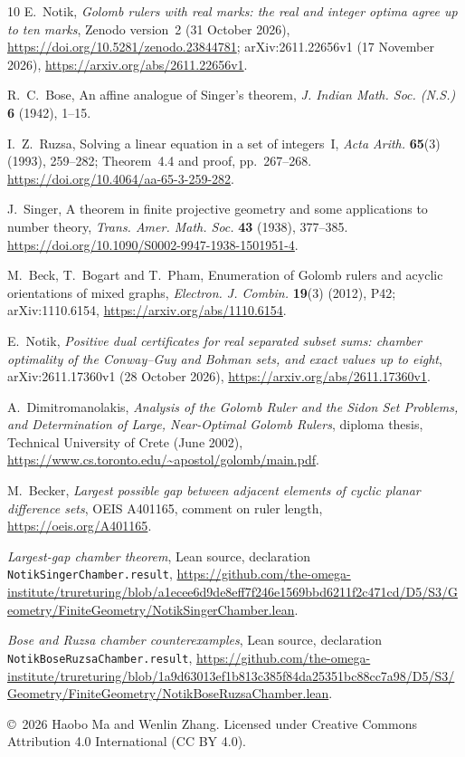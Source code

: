 \documentclass[11pt,a4paper]{article}
\begin{document}
\begin{thebibliography}{10}
E.~Notik, \emph{Golomb rulers with real marks: the real and integer optima
agree up to ten marks}, Zenodo version~2 (31 October 2026),
\url{https://doi.org/10.5281/zenodo.23844781};
arXiv:2611.22656v1 (17 November 2026),
\url{https://arxiv.org/abs/2611.22656v1}.

R.~C.~Bose, An affine analogue of Singer's theorem,
\emph{J. Indian Math. Soc. (N.S.)} \textbf{6} (1942), 1--15.

I.~Z.~Ruzsa, Solving a linear equation in a set of integers~I,
\emph{Acta Arith.} \textbf{65}(3) (1993), 259--282;
Theorem~4.4 and proof, pp.~267--268.
\url{https://doi.org/10.4064/aa-65-3-259-282}.

J.~Singer, A theorem in finite projective geometry and some applications
to number theory, \emph{Trans. Amer. Math. Soc.} \textbf{43} (1938),
377--385. \url{https://doi.org/10.1090/S0002-9947-1938-1501951-4}.

M.~Beck, T.~Bogart and T.~Pham, Enumeration of Golomb rulers and acyclic
orientations of mixed graphs, \emph{Electron. J. Combin.}
\textbf{19}(3) (2012), P42; arXiv:1110.6154,
\url{https://arxiv.org/abs/1110.6154}.

E.~Notik, \emph{Positive dual certificates for real separated subset sums:
chamber optimality of the Conway--Guy and Bohman sets, and exact values
up to eight}, arXiv:2611.17360v1 (28 October 2026),
\url{https://arxiv.org/abs/2611.17360v1}.

A.~Dimitromanolakis, \emph{Analysis of the Golomb Ruler and the Sidon
Set Problems, and Determination of Large, Near-Optimal Golomb Rulers},
diploma thesis, Technical University of Crete (June 2002),
\url{https://www.cs.toronto.edu/~apostol/golomb/main.pdf}.

M.~Becker, \emph{Largest possible gap between adjacent elements of
cyclic planar difference sets}, OEIS A401165, comment on ruler length,
\url{https://oeis.org/A401165}.

\emph{Largest-gap chamber theorem}, Lean source,
declaration \texttt{NotikSingerChamber.result},
\url{https://github.com/the-omega-institute/trureturing/blob/a1ecee6d9de8eff7f246e1569bbd6211f2c471cd/D5/S3/Geometry/FiniteGeometry/NotikSingerChamber.lean}.

\emph{Bose and Ruzsa chamber counterexamples}, Lean source,
declaration \texttt{NotikBoseRuzsaChamber.result},
\url{https://github.com/the-omega-institute/trureturing/blob/1a9d63013ef1b813c385f84da25351bc88cc7a98/D5/S3/Geometry/FiniteGeometry/NotikBoseRuzsaChamber.lean}.
\end{thebibliography}
\endgroup
\bigskip
\noindent\small\copyright\ 2026 Haobo Ma and Wenlin Zhang.
Licensed under Creative Commons Attribution 4.0 International
(CC BY 4.0).
\end{document}
